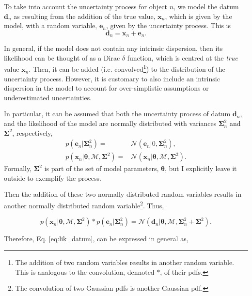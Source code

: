 To take into account the uncertainty process for object $n$, we model the datum $\mathbf{d}_n$ as resulting from the addition of the true value, $\mathbf{x}_n$, which is given by the model, with a random variable, $\mathbf{e}_n$, given by the uncertainty process. This is
\begin{equation}
\mathbf{d}_n = \mathbf{x}_n + \mathbf{e}_n. \nonumber
\end{equation}

In general, if the model does not contain any intrinsic dispersion, then its likelihood can be thought of as a Dirac $\delta$ function, which is centred at the \emph{true} value $\mathbf{x}_n$. Then, it can be added (i.e. convolved\footnote{The addition of two random variables results in another random variable. This is analogous  to the convolution, dennoted $*$, of their \glspl{pdf}.}) to the distribution of the uncertainty process. However, it is customary to also include an intrinsic dispersion in the model to account for over-simplistic assumptions or underestimated uncertainties. 

In particular, it can be assumed that both the uncertainty process of datum $\mathbf{d}_n$, and the likelihood of the model are normally distributed with variances $\boldsymbol{\Sigma}_n^2$ and $\boldsymbol{\Sigma}^2$, respectively, 
\begin{align}
p(\mathbf{e}_n|\mathbf{\Sigma}_n^2)= &\mathcal{N}(\mathbf{e}_n|0,\boldsymbol{\Sigma}_n^2), \nonumber\\
p(\mathbf{x}_n|\boldsymbol{\theta},\mathcal{M},\mathbf{\Sigma}^2)= &\mathcal{N}(\mathbf{x}_n|\boldsymbol{\theta},\mathcal{M},\boldsymbol{\Sigma}^2).\nonumber
\end{align}
Formally, $\boldsymbol{\Sigma}^2$ is part of the set of model parameters, $\boldsymbol{\theta}$, but I explicitly leave it outside to exemplify the process. 

Then the addition of these two normally distributed random variables results in another normally distributed random variable\footnote{The convolution of two Gaussian \glspl{pdf}  is another Gaussian \gls{pdf}.}. Thus,

\begin{equation}
p(\mathbf{x}_n|\boldsymbol{\theta},\mathcal{M},\boldsymbol{\Sigma}^2)*p(\mathbf{e}_n|\boldsymbol{\Sigma}_n^2) = \mathcal{N}(\mathbf{d}_n|\boldsymbol{\theta},\mathcal{M},\boldsymbol{\Sigma}_n^2+\boldsymbol{\Sigma}^2).
\end{equation}

Therefore, Eq. \ref{eq:lik_datum}, can be expressed in general as,

